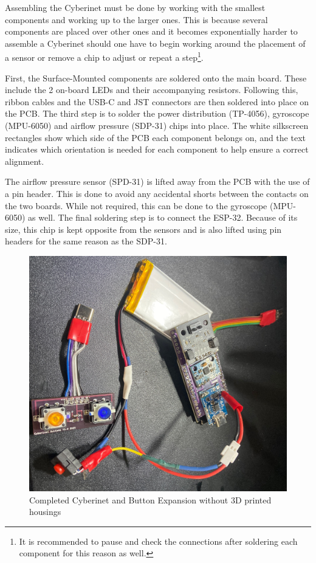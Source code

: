 Assembling the Cyberinet must be done by working with the smallest components and working up to the larger ones. This is because several components are placed over other ones and it becomes exponentially harder to assemble a Cyberinet should one have to begin working around the placement of a sensor or remove a chip to adjust or repeat a step\footnote{It is recommended to pause and check the connections after soldering each component for this reason as well.}.

First, the Surface-Mounted components are soldered onto the main board. These include the 2 on-board LEDs and their accompanying resistors. Following this, ribbon cables and the USB-C and JST connectors are then soldered into place on the PCB. The third step is to solder the power distribution (TP-4056), gyroscope (MPU-6050) and airflow pressure (SDP-31) chips into place. The white silkscreen rectangles show which side of the PCB each component belongs on, and the text indicates which orientation is needed for each component to help ensure a correct alignment.

The airflow pressure sensor (SPD-31) is lifted away from the PCB with the use of a pin header. This is done to avoid any accidental shorts between the contacts on the two boards. While not required, this can be done to the gyroscope (MPU-6050) as well. The final soldering step is to connect the ESP-32. Because of its size, this chip is kept opposite from the sensors and is also lifted using pin headers for the same reason as the SDP-31.

\begin{center}
    \begin{figure}
        \centering
        \includegraphics[scale=0.1, angle=90]{diagrams/builtUnits/noCase.JPG}
        \caption{Completed Cyberinet and Button Expansion without 3D printed housings}
        \label{fig:CyberinetNoCase}
    \end{figure}
\end{center}

